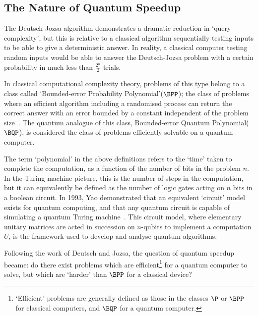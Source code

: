 \documentclass{standalone}
\begin{document}
\subsection{The Nature of Quantum Speedup}\label{sec:WhatSpeedup}
The Deutsch-Jozsa algorithm demonstrates a dramatic reduction in `query complexity', but this is relative to a classical algorithm sequentially testing inputs to be able to give a deterministic answer. In reality, a classical computer testing random inputs would be able to answer the Deutsch-Jozsa problem with a certain probability in much less than $\frac{2^{n}}{2}$ trials. 
\par
In classical computational complexity theory, problems of this type belong to a class called `Bounded-error Probability Polynomial'($\BPP$); the class of problems where an efficient algorithm including a randomised process can return the correct answer with an error bounded by a constant independent of the problem size~\cite{Bennett1997}. The quantum analogue of this class, Bounded-error Quantum Polynomial($\BQP$), is considered the class of problems efficiently solvable on a quantum computer.
\par
The term `polynomial' in the above definitions refers to the `time' taken to complete the computation, as a function of the number of bits in the problem $n$. In the Turing machine picture, this is the number of steps in the computation, but it can equivalently be defined as the number of logic gates acting on $n$ bits in a boolean circuit. In 1993, Yao demonstrated that an equivalent `circuit' model exists for quantum computing, and that any quantum circuit is capable of simulating a quantum Turing machine~\cite{Yao1993}. This circuit model, where elementary unitary matrices are acted in succession on $n$-qubits to implement a computation $U$, is the framework used to develop and analyse quantum algorithms. 
\par
Following the work of Deutsch and Jozsa, the question of quantum speedup became: do there exist problems which are efficient\footnote{`Efficient' problems are generally defined as those in the classes $\P$ or $\BPP$ for classical computers, and $\BQP$ for a quantum computer.} for a quantum computer to solve, but which are `harder' than $\BPP$ for a classical device?
\par
\end{document}

